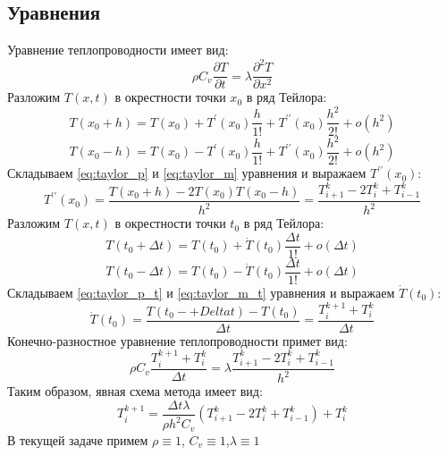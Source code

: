 \documentclass[a4paper]{article}
\begin{document}
    \subsection{Уравнения}
        Уравнение теплопроводности имеет вид:
        \begin{equation}\label{eq:parabol_eq}
            \rho C_v \frac{\partial T}{\partial t}=\lambda \frac{\partial^{2} T}{\partial x^{2}}
        \end{equation}
        Разложим $T(x,t)$ в окрестности точки $x_0$ в ряд Тейлора:
        \begin{equation}\label{eq:taylor_p}
            T(x_0+h)=T(x_0)+T^{\prime}(x_0) \frac{h}{1!}+T^{\prime \prime}(x_0) \frac{h^{2}}{2!}+o(h^2)
        \end{equation}
        \begin{equation}\label{eq:taylor_m} 
            T(x_0-h)=T(x_0)-T^{\prime}(x_0) \frac{h}{1!}+T^{\prime \prime}(x_0) \frac{h^{2}}{2!}+o(h^2)
        \end{equation}
        Складываем \ref{eq:taylor_p} и \ref{eq:taylor_m} уравнения и выражаем $ T^{\prime \prime}(x_0) $:
        \begin{equation}\label{eq:taylor_sym} 
            T^{\prime \prime}(x_0)=\frac{T(x_0+h)-2 T(x_0) T(x_0-h)}{h^2}=\frac{T^{k}_{i+1}-2 T^{k}_{i}+T^{k}_{i-1}}{h^2}
        \end{equation}
        Разложим $T(x,t)$ в окрестности точки $t_0$ в ряд Тейлора:
        \begin{equation}\label{eq:taylor_p_t} 
            T(t_0+\Delta t)=T(t_0)+\dot{T}(t_0) \frac{\Delta t}{1!}+o(\Delta t)
        \end{equation}
        \begin{equation}\label{eq:taylor_m_t} 
            T(t_0-\Delta t)=T(t_0)-\dot{T}(t_0) \frac{\Delta t}{1!}+o(\Delta t)
        \end{equation}
        Складываем \ref{eq:taylor_p_t} и \ref{eq:taylor_m_t} уравнения и выражаем $ \dot{T}(t_0) $:
        \begin{equation}\label{eq:taylor_sym_t} 
            \dot{T}(t_0)=\frac{T(t_0-+Delta t)-T(t_0)}{\Delta t}=\frac{T^{k+1}_{i}+T^{k}_{i}}{\Delta t}
        \end{equation}
        Конечно-разностное уравнение теплопроводности примет вид:
        \begin{equation}\label{eq:mkr} 
        \rho C_v \frac{T^{k+1}_{i}+T^{k}_{i}}{\Delta t} = \lambda \frac{T^{k}_{i+1}-2 T^{k}_{i}+T^{k}_{i-1}}{h^2}
        \end{equation}
        Таким образом, явная схема метода имеет вид:
        \begin{equation}\label{eq:explicit_schema} 
            T^{k+1}_{i}=\frac{\Delta t \lambda}{\rho h^2 C_v}(T^{k}_{i+1}-2 T^{k}_{i}+T^{k}_{i-1})+T^{k}_{i}
        \end{equation}
        В текущей задаче примем $\rho \equiv 1$, $C_v \equiv 1$,$\lambda \equiv 1$
        \newpage
\end{document}
